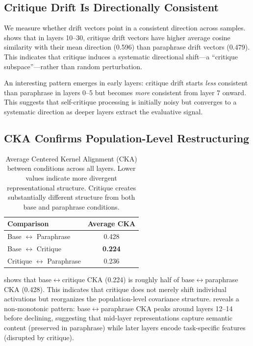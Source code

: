 \subsection{Critique Drift Is Directionally Consistent}

We measure whether drift vectors point in a consistent direction across samples.  shows that in layers 10--30, critique drift vectors have higher average cosine similarity with their mean direction (0.596) than paraphrase drift vectors (0.479). This indicates that critique induces a systematic directional shift---a ``critique subspace''---rather than random perturbation.

An interesting pattern emerges in early layers: critique drift starts \emph{less} consistent than paraphrase in layers 0--5 but becomes \emph{more} consistent from layer 7 onward. This suggests that self-critique processing is initially noisy but converges to a systematic direction as deeper layers extract the evaluative signal.

\subsection{CKA Confirms Population-Level Restructuring}

\begin{table}[t]
    \centering
    \caption{Average Centered Kernel Alignment (CKA) between conditions across all layers. Lower values indicate more divergent representational structure. Critique creates substantially different structure from both base and paraphrase conditions.}
    \begin{tabular}{@{}lc@{}}
        \toprule
        Comparison & Average CKA \\
        \midrule
        Base $\leftrightarrow$ Paraphrase & 0.428 \\
        Base $\leftrightarrow$ Critique & \textbf{0.224} \\
        Critique $\leftrightarrow$ Paraphrase & 0.236 \\
        \bottomrule
    \end{tabular}
    \label{tab:cka}
\end{table}

 shows that base$\leftrightarrow$critique CKA (0.224) is roughly half of base$\leftrightarrow$paraphrase CKA (0.428). This indicates that critique does not merely shift individual activations but reorganizes the population-level covariance structure.  reveals a non-monotonic pattern: base$\leftrightarrow$paraphrase CKA peaks around layers 12--14 before declining, suggesting that mid-layer representations capture semantic content (preserved in paraphrase) while later layers encode task-specific features (disrupted by critique).

